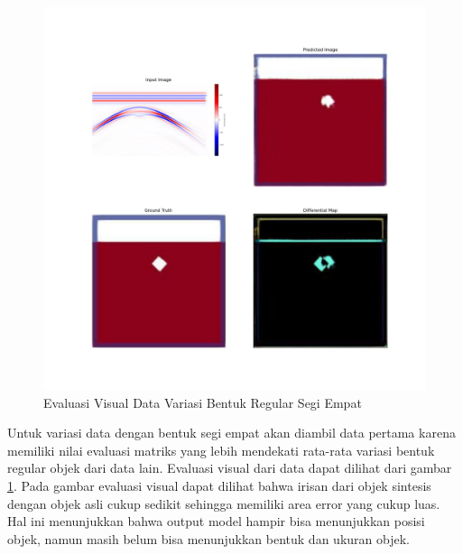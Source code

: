 \begin{figure}[ht]
  \centering
  \includegraphics[scale=0.15]{gambar/diffMapSegi4.jpg}
  \caption{Evaluasi Visual Data Variasi Bentuk Regular Segi Empat}
  \label{fig:diffmapsegi4}
\end{figure}

Untuk variasi data dengan bentuk segi empat akan diambil data pertama karena memiliki nilai evaluasi matriks yang lebih mendekati rata-rata variasi bentuk regular objek dari data lain. 
Evaluasi visual dari data dapat dilihat dari gambar \ref{fig:diffmapsegi4}. 
Pada gambar evaluasi visual dapat dilihat bahwa irisan dari objek sintesis dengan objek asli cukup sedikit sehingga memiliki area error yang cukup luas. 
Hal ini menunjukkan bahwa output model hampir bisa menunjukkan posisi objek, namun masih belum bisa menunjukkan bentuk dan ukuran objek.
